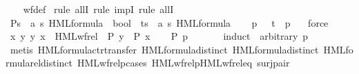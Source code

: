 \begin{isabellebody}
%
\isadelimproof
\ \ %
\endisadelimproof
%
\isatagproof
{}\isamarkupfalse%
\ wf{\isacharunderscore}{\kern0pt}def\isanewline
{}\isamarkupfalse%
\ {\isacharparenleft}{\kern0pt}rule\ allI{\isacharcomma}{\kern0pt}\ rule\ impI{\isacharcomma}{\kern0pt}\ rule\ allI{\isacharparenright}{\kern0pt}\isanewline
\ \ \isamarkupfalse%
\ P{\isacharcolon}{\kern0pt}{\isacharcolon}{\kern0pt}{\isacartoucheopen}{\isacharprime}{\kern0pt}s\ {\isasymtimes}\ {\isacharparenleft}{\kern0pt}{\isacharprime}{\kern0pt}a{\isacharcomma}{\kern0pt}\ {\isacharprime}{\kern0pt}s{\isacharparenright}{\kern0pt}\ HML{\isacharunderscore}{\kern0pt}formula\ {\isasymRightarrow}\ bool{\isacartoucheclose}\ \ t{\isacharcolon}{\kern0pt}{\isacharcolon}{\kern0pt}{\isacartoucheopen}{\isacharprime}{\kern0pt}s\ {\isasymtimes}\ {\isacharparenleft}{\kern0pt}{\isacharprime}{\kern0pt}a{\isacharcomma}{\kern0pt}\ {\isacharprime}{\kern0pt}s{\isacharparenright}{\kern0pt}\ HML{\isacharunderscore}{\kern0pt}formula{\isacartoucheclose}\isanewline
\ \ \isamarkupfalse%
\ p\ {\isasymphi}\ \ {\isacartoucheopen}t\ {\isacharequal}{\kern0pt}\ {\isacharparenleft}{\kern0pt}p{\isacharcomma}{\kern0pt}\ {\isasymphi}{\isacharparenright}{\kern0pt}{\isacartoucheclose}\ \isamarkupfalse%
\ force\isanewline
\ \ \isamarkupfalse%
\ {\isacartoucheopen}{\isasymforall}x{\isachardot}{\kern0pt}\ {\isacharparenleft}{\kern0pt}{\isasymforall}y{\isachardot}{\kern0pt}\ {\isacharparenleft}{\kern0pt}y{\isacharcomma}{\kern0pt}\ x{\isacharparenright}{\kern0pt}\ {\isasymin}\ HML{\isacharunderscore}{\kern0pt}wf{\isacharunderscore}{\kern0pt}rel\ {\isasymlongrightarrow}\ P\ y{\isacharparenright}{\kern0pt}\ {\isasymlongrightarrow}\ P\ x{\isacartoucheclose}\isanewline
\ \ \isamarkupfalse%
\ {\isacartoucheopen}P\ {\isacharparenleft}{\kern0pt}p{\isacharcomma}{\kern0pt}\ {\isasymphi}{\isacharparenright}{\kern0pt}{\isacartoucheclose}\isanewline
\ \ \ \ \isamarkupfalse%
\ {\isacharparenleft}{\kern0pt}induct\ {\isasymphi}\ arbitrary{\isacharcolon}{\kern0pt}\ p{\isacharparenright}{\kern0pt}\isanewline
\ \ \ \ \isamarkupfalse%
\ {\isacharparenleft}{\kern0pt}metis\ HML{\isacharunderscore}{\kern0pt}formula{\isachardot}{\kern0pt}ctr{\isacharunderscore}{\kern0pt}transfer{\isacharparenleft}{\kern0pt}{}{\isacharparenright}{\kern0pt}\ HML{\isacharunderscore}{\kern0pt}formula{\isachardot}{\kern0pt}distinct{\isacharparenleft}{\kern0pt}{}{\isacharparenright}{\kern0pt}\ HML{\isacharunderscore}{\kern0pt}formula{\isachardot}{\kern0pt}distinct{\isacharparenleft}{\kern0pt}{}{\isacharparenright}{\kern0pt}\ HML{\isacharunderscore}{\kern0pt}formula{\isachardot}{\kern0pt}rel{\isacharunderscore}{\kern0pt}distinct{\isacharparenleft}{\kern0pt}{}{\isacharparenright}{\kern0pt}\ HML{\isacharunderscore}{\kern0pt}wf{\isacharunderscore}{\kern0pt}relp{\isachardot}{\kern0pt}cases\ HML{\isacharunderscore}{\kern0pt}wf{\isacharunderscore}{\kern0pt}relp{\isacharunderscore}{\kern0pt}HML{\isacharunderscore}{\kern0pt}wf{\isacharunderscore}{\kern0pt}rel{\isacharunderscore}{\kern0pt}eq\ surj{\isacharunderscore}{\kern0pt}pair{\isacharparenright}{\kern0pt}\isanewline

\end{isabellebody}
